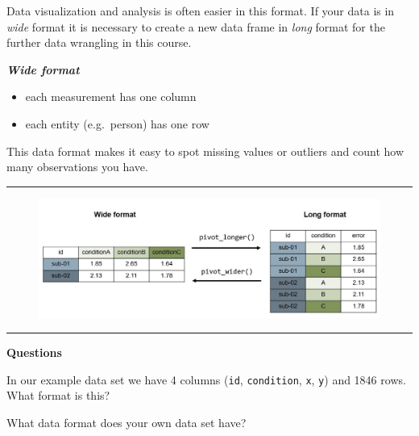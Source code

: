 \documentclass[
  letterpaper,
  DIV=11,
  numbers=noendperiod,
  oneside]{scrreprt}
\begin{document}
Data visualization and analysis is often easier in this format. If your
data is in \emph{wide} format it is necessary to create a new data frame
in \emph{long} format for the further data wrangling in this course.

\textbf{\emph{Wide format}}

\begin{itemize}
\item
  each measurement has one column
\item
  each entity (e.g.~person) has one row
\end{itemize}

This data format makes it easy to spot missing values or outliers and
count how many observations you have.

\begin{center}\rule{0.5\linewidth}{0.5pt}\end{center}

\begin{figure}

{\centering \includegraphics{imgs/widelongformat.JPG}

}

\end{figure}

\begin{center}\rule{0.5\linewidth}{0.5pt}\end{center}

\begin{tcolorbox}[enhanced jigsaw, arc=.35mm, left=2mm, breakable, toprule=.15mm, opacityback=0, colframe=quarto-callout-tip-color-frame, colback=white, rightrule=.15mm, bottomrule=.15mm, leftrule=.75mm]
\begin{minipage}[t]{5.5mm}
\textcolor{quarto-callout-tip-color}{\faLightbulb}
\end{minipage}%
\begin{minipage}[t]{\textwidth - 5.5mm}

\textbf{Questions}\vspace{2mm}

In our example data set we have 4 columns (\texttt{id},
\texttt{condition}, \texttt{x}, \texttt{y}) and 1846 rows. What format
is this?

What data format does your own data set have?

\end{minipage}%
\end{tcolorbox}
\end{document}

